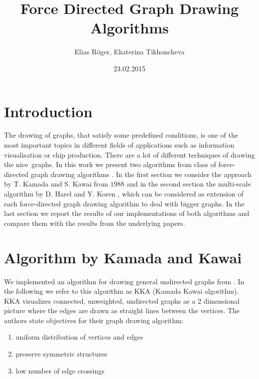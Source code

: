 \documentclass[12pt,a4paper]{article}
\author{Elias Röger, Ekaterina Tikhoncheva}
\title{Force Directed Graph Drawing Algorithms}
\date{23.02.2015}
\begin{document}
\maketitle

\section{Introduction}

The drawing of graphs, that satisfy some predefined conditions, is one of the most important topics in different fields of applications such as information visualisation or chip production. There are a lot of different techniques of drawing the \glqq nice\grqq\ graphs. In this work we present two algorithms from class of force-directed graph drawing algorithms \cite{Kobouro}. In the first section we consider the approach by T. Kamada and S. Kawai \cite{TomihisaKamada1989} from $1988$ and in the second section the multi-scale algorithm by D. Harel and Y. Koren \cite{DavidHarel2002}, which can be considered as extension of each force-directed graph drawing algorithm to deal with bigger graphs. In the last section we report the results of our implementations of both algorithms and compare them with the results from the underlying papers.


\section{Algorithm by Kamada and Kawai}
\label{section1}

We implemented an algorithm for drawing general undirected graphs from \cite{TomihisaKamada1989}. In the following we refer to this algorithm as KKA (Kamada Kawai algorithm). \\ KKA visualizes connected, unweighted, undirected graphs as a 2 dimensional picture where the edges are drawn as straight lines between the vertices. The authors state objectives for their graph drawing algorithm:
\begin{enumerate}
	\item uniform distribution of vertices and edges
	\item preserve symmetric structures
	\item low number of edge crossings
\end{enumerate}
\end{document}
